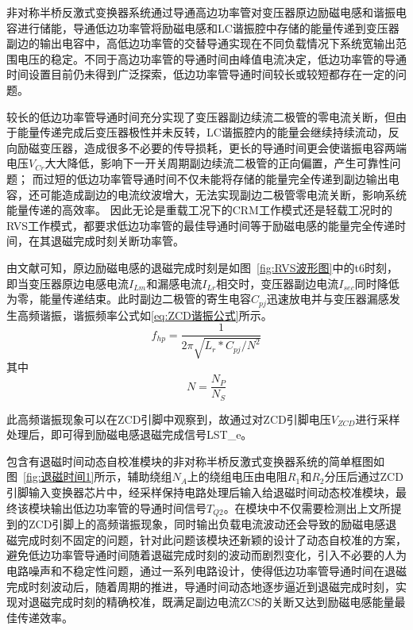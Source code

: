 非对称半桥反激式变换器系统通过导通高边功率管对变压器原边励磁电感和谐振电容进行储能，导通低边功率管将励磁电感和LC谐振腔中存储的能量传递到变压器副边的输出电容中，高低边功率管的交替导通实现在不同负载情况下系统宽输出范围电压的稳定。不同于高边功率管的导通时间由峰值电流决定，低边功率管的导通时间设置目前仍未得到广泛探索，低边功率管导通时间较长或较短都存在一定的问题。

较长的低边功率管导通时间充分实现了变压器副边续流二极管的零电流关断，但由于能量传递完成后变压器极性并未反转，LC谐振腔内的能量会继续持续流动，反向励磁变压器，造成很多不必要的传导损耗，更长的导通时间更会使谐振电容两端电压$V_{Cr}$大大降低，影响下一开关周期副边续流二极管的正向偏置，产生可靠性问题；
而过短的低边功率管导通时间不仅未能将存储的能量完全传递到副边输出电容，还可能造成副边的电流纹波增大，无法实现副边二极管零电流关断，影响系统能量传递的高效率。
因此无论是重载工况下的CRM工作模式还是轻载工况时的RVS工作模式，都要求低边功率管的最佳导通时间等于励磁电感的能量完全传递时间，在其退磁完成时刻关断功率管。

由文献可知，原边励磁电感的退磁完成时刻是如图~\ref{fig:RVS波形图}中的t6时刻，即当变压器原边电感电流$I_{Lm}$和漏感电流$I_{Lr}$相交时，变压器副边电流$I_{sec}$同时降低为零，能量传递结束。此时副边二极管的寄生电容$C_{pj}$迅速放电并与变压器漏感发生高频谐振，谐振频率公式如\eqref{eq:ZCD谐振公式}所示。
\begin{equation}
    \label{eq:ZCD谐振公式}
    f_{hp} = \frac{1}{2\pi \sqrt{L_r * C_{pj}/N^2}}
\end{equation}
其中 
\begin{equation}
    \label{eq:变压器匝比}
    N=\frac{N_P}{N_S}
\end{equation}

此高频谐振现象可以在ZCD引脚中观察到，故通过对ZCD引脚电压$V_{ZCD}$进行采样处理后，即可得到励磁电感退磁完成信号LST\_e。

包含有退磁时间动态自校准模块的非对称半桥反激式变换器系统的简单框图如图~\ref{fig:退磁时间1}所示，辅助绕组$N_A$上的绕组电压由电阻$R_1$和$R_2$分压后通过ZCD引脚输入变换器芯片中，经采样保持电路处理后输入给退磁时间动态校准模块，最终该模块输出低边功率管的导通时间信号$T_{Q2}$。在模块中不仅需要检测出上文所提到的ZCD引脚上的高频谐振现象，同时输出负载电流波动还会导致的励磁电感退磁完成时刻不固定的问题，针对此问题该模块还新颖的设计了动态自校准的方案，避免低边功率管导通时间随着退磁完成时刻的波动而剧烈变化，引入不必要的人为电路噪声和不稳定性问题，通过一系列电路设计，使得低边功率管导通时间在退磁完成时刻波动后，随着周期的推进，导通时间动态地逐步逼近到退磁完成时刻，实现对退磁完成时刻的精确校准，既满足副边电流ZCS的关断又达到励磁电感能量最佳传递效率。

